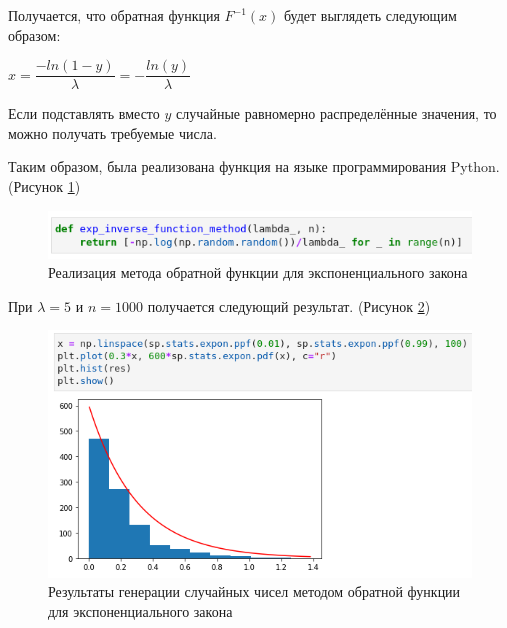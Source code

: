 \documentclass[14pt,fleqn]{extarticle}
\begin{document}
	Получается, что обратная функция $F^{-1}(x)$ будет выглядеть следующим образом:
	\begin{center}
		$x = \dfrac{-ln(1-y)}{\lambda} = -\dfrac{ln(y)}{\lambda}$
	\end{center}
	Если подставлять вместо $y$ случайные равномерно распределённые значения, то можно получать требуемые числа.
	
	Таким образом, была реализована функция на языке программирования Python. (Рисунок \ref{fig:exp_inverse_function_method_code})
	\begin{figure}[h]
		\centering \includegraphics[scale=0.8]{exp_inverse_function_method_code}
		\caption{Реализация метода обратной функции для экспоненциального закона}
		\label{fig:exp_inverse_function_method_code}
	\end{figure}

	При $\lambda = 5$ и $n = 1000$ получается следующий результат. (Рисунок \ref{fig:exp_inverse_function_method_result})
	\begin{figure}[h]
		\centering \includegraphics[scale=0.7]{exp_inverse_function_method_result}
		\caption{Результаты генерации случайных чисел методом обратной функции для экспоненциального закона}
		\label{fig:exp_inverse_function_method_result}
	\end{figure}
\end{document}
